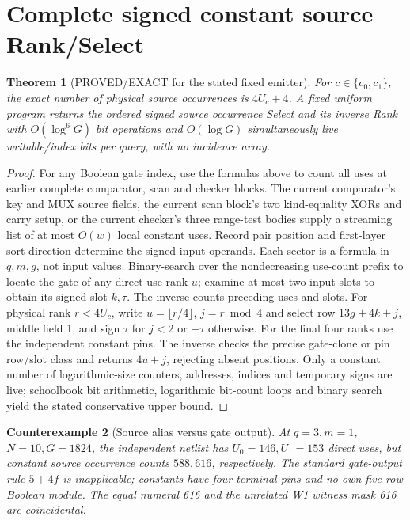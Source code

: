 \documentclass[11pt]{article}
\newtheorem{theorem}{Theorem}
\newtheorem{counterexample}[theorem]{Counterexample}
\begin{document}
\section{Complete signed constant source Rank/Select}
\begin{theorem}[PROVED/EXACT for the stated fixed emitter]
For \(c\in\{c_0,c_1\}\), the exact number of physical
source occurrences is \(4U_c+4\). A fixed uniform
program returns the ordered signed source occurrence
Select and its inverse Rank with \(O(\log^6G)\) bit
operations and \(O(\log G)\) simultaneously live
writable/index bits per query, with no incidence array.
\end{theorem}
\begin{proof}
For any Boolean gate index, use the formulas above
to count all uses at earlier complete comparator,
scan and checker blocks. The current comparator's
key and MUX source fields, the current scan block's
two kind-equality XORs and carry setup, or the current
checker's three range-test bodies supply a streaming
list of at most \(O(w)\) local constant uses.
Record pair position and first-layer sort direction
determine the signed input operands. Each sector
is a formula in \(q,m,g\), not input values.
Binary-search over the nondecreasing use-count prefix
to locate the gate of any direct-use rank \(u\);
examine at most two input slots to obtain its
signed slot \(k,\tau\). The inverse counts preceding
uses and slots. For physical rank \(r<4U_c\), write
\(u=\lfloor r/4\rfloor\), \(j=r\bmod4\) and select
row \(13g+4k+j\), middle field 1, and sign
\(\tau\) for \(j<2\) or \(-\tau\) otherwise.
For the final four ranks use the independent
constant pins. The inverse checks the precise
gate-clone or pin row/slot class and returns
\(4u+j\), rejecting absent positions.
Only a constant number of logarithmic-size counters,
addresses, indices and temporary signs are live;
schoolbook bit arithmetic, logarithmic bit-count
loops and binary search yield the stated
conservative upper bound.
\end{proof}

\begin{counterexample}[Source alias versus gate output]
At \(q=3,m=1\), \(N=10,G=1824\), the independent
netlist has \(U_0=146,U_1=153\) direct uses, but
constant source occurrence counts \(588,616\),
respectively. The standard gate-output rule \(5+4f\)
is inapplicable; constants have four terminal pins
and no own five-row Boolean module.
The equal numeral 616 and the unrelated W1 witness
mask 616 are coincidental.
\end{counterexample}
\end{document}
